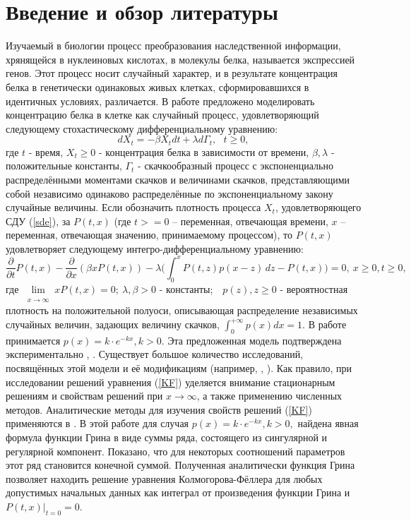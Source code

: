 \section{Введение и обзор литературы} %
Изучаемый в биологии процесс преобразования наследственной информации, хрянящейся в нуклеиновых кислотах, в молекулы белка, называется экспрессией генов. Этот процесс носит случайный характер, и в результате концентрация белка в генетически одинаковых живых клетках, сформировавшихся в идентичных условиях, различается. В работе \cite{phis_basic} предложено моделировать концентрацию белка в клетке как случайный процесс, удовлетворяющий следующему стохастическому дифференциальному уравнению:
\begin{equation}\label{sde}
    dX_t=-\beta X_t dt + \lambda d \Gamma_t,\ \ \  t\ge0,
\end{equation}
где $t$ - время, $X_t \ge 0$ - концентрация белка в зависимости от времени, $\beta, \lambda$ - положительные константы,
$\Gamma_t$ - скачкообразный процесс с экспоненциально распределёнными моментами скачков и величинами скачков, представляющими собой независимо одинаково распределённые по экспоненциальному закону случайные величины. Если обозначить плотность процесса $X_t$, удовлетворяющего СДУ (\ref{sde}), за $P(t,x)$ (где $t>=0$ – переменная, отвечающая времени, $x$ – переменная, отвечающая значению, принимаемому процессом), то $P(t,x)$ удовлетворяет следующему интегро-дифференциальному уравнению:
\begin{equation}\label{KF}
    \frac{\partial}{\partial t} P(t,x) -
    \frac{\partial}{\partial x}(\beta x  P(t,x)) -\lambda \Big( \int_{0}^{x} P(t, z) p(x-z) \,dz - P(t,x) \Big) = 0,
   \ x\ge0, t\ge 0,
\end{equation}
где $\lim\limits_{\substack{\\x \to \infty}}  xP(t,x)=0; \
\lambda, \beta > 0 $ - константы;\ \  $p(z), z \ge 0$ - вероятностная плотность на положительной полуоси, описывающая распределение независимых случайных величин, задающих величину скачков,
$ \int_{0}^{+\infty} p(x) dx =1$. В работе \cite{phis_basic} принимается
$p(x)=k \cdot e^{-k x}, k>0.$ Эта предложенная модель подтверждена экспериментально \cite{first_exp}, \cite{second_exp}. Существует большое количество исследований, посвящённых этой модели и её модификациям (например, \cite{mod1}, \cite{mod2}). Как правило, при исследовании решений уравнения (\ref{KF}) уделяется внимание стационарным решениям и свойствам решений при $x \rightarrow \infty$, а также применению численных методов. Аналитические методы для изучения свойств решений (\ref{KF}) применяются в \cite{main}. В этой работе для случая $p(x)=k \cdot e^{-k x}, k>0,$ найдена явная формула функции Грина в виде суммы ряда, состоящего из сингулярной и регулярной компонент.
Показано, что для некоторых соотношений параметров этот ряд становится конечной суммой. Полученная аналитически функция Грина позволяет
находить решение уравнения Колмогорова-Фёллера для любых допустимых
начальных данных как интеграл от произведения функции Грина и $P(t,x)|_{t=0}=0$.

